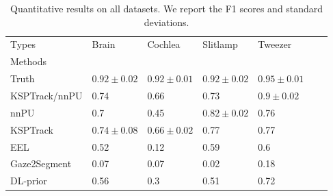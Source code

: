 \begin{table*}[t]
\centering
\caption{
    Quantitative results on all datasets. We report the F1 scores and standard deviations.
    }
\label{tab:results}
\begin{tabular}{llp{1.8cm}p{1.8cm}p{1.8cm}p{1.8cm}p{1.8cm}}
\toprule
Types &                 Brain &               Cochlea &              Slitlamp &              Tweezer \\
Methods       &                       &                       &                       &                      \\
\midrule
Truth         &       $0.92 \pm 0.02$ &       $0.92 \pm 0.01$ &       $0.92 \pm 0.02$ &      $0.95 \pm 0.01$ \\
\hline

KSPTrack/nnPU &                  0.74 &                  0.66 &                  0.73 &  $\bm{0.9} \pm 0.02$ \\
nnPU          &                   0.7 &                  0.45 &  $\bm{0.82} \pm 0.02$ &                 0.76 \\
\hdashline
KSPTrack      &  $\bm{0.74} \pm 0.08$ &  $\bm{0.66} \pm 0.02$ &                  0.77 &                 0.77 \\
EEL           &                  0.52 &                  0.12 &                  0.59 &                  0.6 \\
Gaze2Segment  &                  0.07 &                  0.07 &                  0.02 &                 0.18 \\
DL-prior      &                  0.56 &                   0.3 &                  0.51 &                 0.72 \\
\bottomrule
\end{tabular}
\end{table*}
